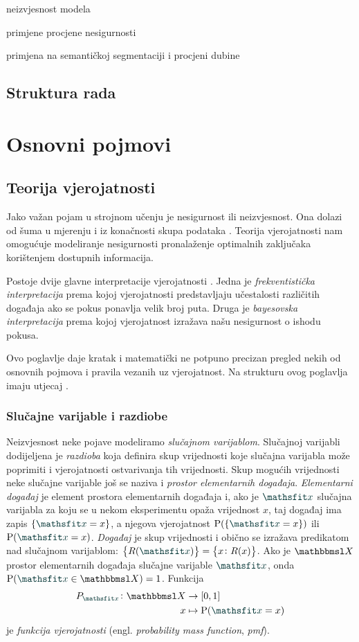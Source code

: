 \documentclass[utf8, diplomski, lmodern]{fer}
\begin{document}
neizvjesnost modela

primjene procjene nesigurnosti

primjena na semantičkoj segmentaciji i procjeni dubine


\section{Struktura rada}



\chapter{Osnovni pojmovi}


\section{Teorija vjerojatnosti}

Jako važan pojam u strojnom učenju je nesigurnost ili neizvjesnost. Ona dolazi od šuma u mjerenju i iz konačnosti skupa podataka \citep{Bishop:2006:PRML}. Teorija vjerojatnosti nam omogućuje modeliranje nesigurnosti pronalaženje optimalnih zaključaka korištenjem dostupnih informacija.

Postoje dvije glavne interpretacije vjerojatnosti \citep{Murphy:2012:MLPP}. Jedna je \emph{frekventistička interpretacija} prema kojoj vjerojatnosti predstavljaju učestalosti različitih događaja ako se pokus ponavlja velik broj puta. Druga je \emph{bayesovska interpretacija} prema kojoj vjerojatnost izražava našu nesigurnost o ishodu pokusa. 
 
Ovo poglavlje daje kratak i matematički ne potpuno precizan pregled nekih od osnovnih pojmova i pravila vezanih uz vjerojatnost. Na strukturu ovog poglavlja imaju utjecaj \citet{Goodfellow:2016:DL,Murphy:2012:MLPP}.

\subsection{Slučajne varijable i razdiobe}

Neizvjesnost neke pojave modeliramo \emph{slučajnom varijablom}. Slučajnoj varijabli dodijeljena je \emph{razdioba} koja definira skup vrijednosti koje slučajna varijabla može poprimiti i vjerojatnosti ostvarivanja tih vrijednosti. Skup mogućih vrijednosti neke slučajne varijable još se naziva i \emph{prostor elementarnih događaja}. \emph{Elementarni događaj} je element prostora elementarnih događaja i, ako je $\rvar x$ slučajna varijabla za koju se u nekom eksperimentu opaža vrijednost $x$, taj događaj ima zapis $\cbr{\rvar x = x}$, a njegova vjerojatnost $\P(\cbr{\rvar x = x})$ ili $\P(\rvar x = x)$. \emph{Događaj} je skup vrijednosti i obično se izražava predikatom nad slučajnom varijablom: $\cbr{R(\rvar x)}=\cbr{x\colon R(x)}$. Ako je $\set X$ prostor elementarnih događaja slučajne varijable $\rvar x$, onda $\P(\rvar x\in \set X)=1$. Funkcija 
\begin{align*}
P_{\rvar x} \colon \set X &\to \intcc{0,1} \\
x &\mapsto \P(\rvar x=x)
\end{align*}
je \emph{funkcija vjerojatnosti} (engl. \textit{probability mass function}, \textit{pmf}).
\end{document}
